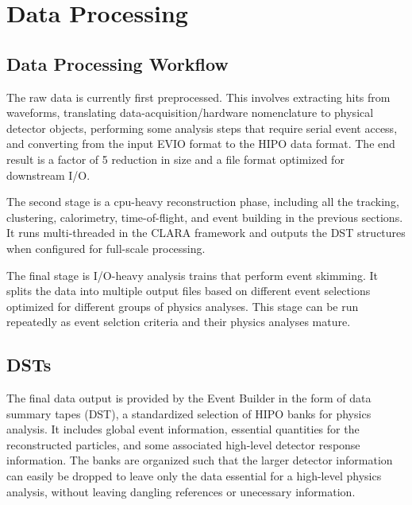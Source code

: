 \documentclass[3p,times,twocolumn]{elsarticle}
\begin{document}
\vfill
\eject

\section{Data Processing}

\subsection{Data Processing Workflow}
The raw data is currently first preprocessed.  This involves extracting hits from waveforms, translating data-acquisition/hardware nomenclature to physical detector objects, performing some analysis steps that require serial event access, and converting from the input EVIO format to the HIPO data format.  The end result is a factor of 5 reduction in size and a file format optimized for downstream I/O.

The second stage is a cpu-heavy reconstruction phase, including all the tracking, clustering, calorimetry, time-of-flight, and event building in the previous sections.  It runs multi-threaded in the CLARA framework and outputs the DST structures when configured for full-scale processing.

The final stage is I/O-heavy analysis trains that perform event skimming.  It splits the data into multiple output files based on different event selections optimized for different groups of physics analyses.  This stage can be run repeatedly as event selction criteria and their physics analyses mature.

\subsection{DSTs}\label{sec:dsts}
The final data output is provided by the Event Builder in the form of data summary tapes (DST), a standardized selection of HIPO banks for physics analysis.  It includes global event information, essential quantities for the reconstructed particles, and some associated high-level detector response information.  The banks are organized such that the larger detector information can easily be dropped to leave only the data essential for a high-level physics analysis, without leaving dangling references or unecessary information.

~~
\end{document}

